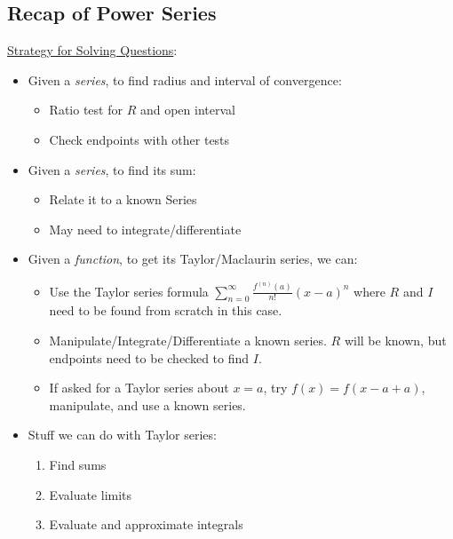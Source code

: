 \subsection*{Recap of Power Series}
\underline{Strategy for Solving Questions}:
\begin{itemize}
    \item Given a \emph{series}, to find radius and interval of
          convergence:
          \begin{itemize}
              \item Ratio test for $ R $ and open interval
              \item Check endpoints with other tests
          \end{itemize}
    \item Given a \emph{series}, to find its sum:
          \begin{itemize}
              \item Relate it to a known Series
              \item May need to integrate/differentiate
          \end{itemize}
    \item Given a \emph{function},
          to get its Taylor/Maclaurin series, we can:
          \begin{itemize}
              \item Use the Taylor series formula $ \displaystyle \sum\limits_{n=0}^{\infty}
                        \frac{f^{(n)}(a)}{n!} (x-a)^n $ where $ R $ and $ I $ need to be found from scratch
                    in this case.
              \item Manipulate/Integrate/Differentiate a known series. $ R $ will be known,
                    but endpoints need to be checked to find $ I $.
              \item If asked for a Taylor series about $ x=a $, try $ f(x)=f(x-a+a) $,
                    manipulate, and use a known series.
          \end{itemize}
    \item Stuff we can do with Taylor series:
          \begin{enumerate}[label=(\Roman*)]
              \item Find sums
              \item Evaluate limits
              \item Evaluate and approximate integrals
          \end{enumerate}
\end{itemize}
